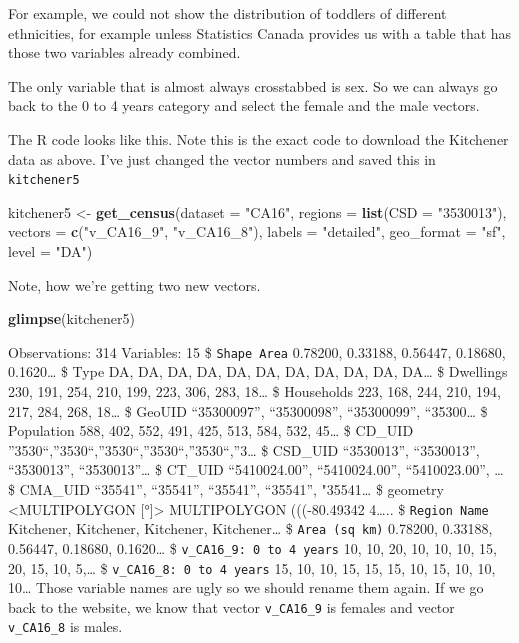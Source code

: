 \documentclass[
]{article}
\newenvironment{Shaded}{\begin{snugshade}}{\end{snugshade}}
\newcommand{\DataTypeTok}[1]{\textcolor[rgb]{0.13,0.29,0.53}{#1}}
\newcommand{\KeywordTok}[1]{\textcolor[rgb]{0.13,0.29,0.53}{\textbf{#1}}}
\newcommand{\NormalTok}[1]{#1}
\newcommand{\StringTok}[1]{\textcolor[rgb]{0.31,0.60,0.02}{#1}}
\begin{document}
For example, we could not show the distribution of toddlers of different
ethnicities, for example unless Statistics Canada provides us with a
table that has those two variables already combined.

The only variable that is almost always crosstabbed is sex. So we can
always go back to the 0 to 4 years category and select the female and
the male vectors.

The R code looks like this. Note this is the exact code to download the
Kitchener data as above. I've just changed the vector numbers and saved
this in \texttt{kitchener5}

\begin{Shaded}
\begin{Highlighting}[]
\NormalTok{kitchener5 <{-}}\StringTok{ }\KeywordTok{get\_census}\NormalTok{(}\DataTypeTok{dataset =} \StringTok{"CA16"}\NormalTok{, }\DataTypeTok{regions =} \KeywordTok{list}\NormalTok{(}\DataTypeTok{CSD =} \StringTok{"3530013"}\NormalTok{), }\DataTypeTok{vectors =} \KeywordTok{c}\NormalTok{(}\StringTok{"v\_CA16\_9"}\NormalTok{, }
    \StringTok{"v\_CA16\_8"}\NormalTok{), }\DataTypeTok{labels =} \StringTok{"detailed"}\NormalTok{, }\DataTypeTok{geo\_format =} \StringTok{"sf"}\NormalTok{, }\DataTypeTok{level =} \StringTok{"DA"}\NormalTok{)}
\end{Highlighting}
\end{Shaded}

Note, how we're getting two new vectors.

\begin{Shaded}
\begin{Highlighting}[]
\KeywordTok{glimpse}\NormalTok{(kitchener5)}
\end{Highlighting}
\end{Shaded}

Observations: 314 Variables: 15 \$ \texttt{Shape\ Area} 0.78200,
0.33188, 0.56447, 0.18680, 0.1620\ldots{} \$ Type DA, DA, DA, DA, DA,
DA, DA, DA, DA, DA, DA\ldots{} \$ Dwellings 230, 191, 254, 210, 199,
223, 306, 283, 18\ldots{} \$ Households 223, 168, 244, 210, 194, 217,
284, 268, 18\ldots{} \$ GeoUID ``35300097'', ``35300098'', ``35300099'',
``35300\ldots{} \$ Population 588, 402, 552, 491, 425, 513, 584, 532,
45\ldots{} \$ CD\_UID
''3530``,''3530``,''3530``,''3530``,''3530``,''3\ldots{} \$ CSD\_UID
``3530013'', ``3530013'', ``3530013'', ``3530013''\ldots{} \$ CT\_UID
``5410024.00'', ``5410024.00'', ``5410023.00'', \ldots{} \$ CMA\_UID
``35541'', ``35541'', ``35541'', ``35541'', "35541\ldots{} \$ geometry
\textless MULTIPOLYGON {[}°{]}\textgreater{} MULTIPOLYGON (((-80.49342
4\ldots.. \$ \texttt{Region\ Name} Kitchener, Kitchener, Kitchener,
Kitchener\ldots{} \$ \texttt{Area\ (sq\ km)} 0.78200, 0.33188, 0.56447,
0.18680, 0.1620\ldots{} \$ \texttt{v\_CA16\_9:\ 0\ to\ 4\ years} 10, 10,
20, 10, 10, 10, 15, 20, 15, 10, 5,\ldots{} \$
\texttt{v\_CA16\_8:\ 0\ to\ 4\ years} 15, 10, 10, 15, 15, 15, 10, 15,
10, 10, 10\ldots{} Those variable names are ugly so we should rename
them again. If we go back to the website, we know that vector
\texttt{v\_CA16\_9} is females and vector \texttt{v\_CA16\_8} is males.
\end{document}
